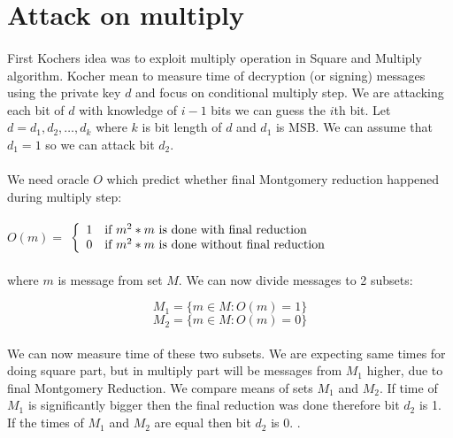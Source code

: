 \documentclass[thesis=B,english]{FITthesis}[2012/10/20]
\begin{document}
\section{Attack on multiply}
\paragraph*{}{
First Kochers idea was to exploit multiply operation in Square and Multiply algorithm. Kocher mean to measure time of decryption (or signing) messages using the private key \(d\) 
and focus on conditional multiply step. We are attacking each bit of \(d\) with knowledge of \( i-1\) bits we can guess the \(i\)th bit. Let \(d = d_1,d_2, \ldots ,d_k \) where \(k\) is bit length of \(d\) and \(d_1\) is MSB. 
We can assume that \( d_1 = 1\) so we can attack bit \(d_2\).
}
\paragraph*{}{
We need oracle \(O\) which predict whether final Montgomery reduction happened during multiply step:
}
\paragraph*{}

\( O(m) =\) $\left\{
  \begin{array}{cl}
    \text{1} & \text{\mbox{if}  \(m^2 * m\) is done with final reduction} \\
    \text{0} & \text{\mbox{if}  \(m^2 * m\) is done without final reduction} 
  \end{array}
\right.$

\paragraph*{}
{
where \(m\) is message from set \(M\). We can now divide messages to 2 subsets:}

\[M_1 = \{m \in M : O(m) = 1\}\]
\[M_2 = \{m \in M : O(m) = 0\}\]

\paragraph*{}{
We can now measure time of these two subsets. We are expecting same times for doing square part, but in multiply part will be messages from \(M_1\) higher, due to
final Montgomery Reduction. We compare means of sets \(M_1\) and \(M_2\). If time of \(M_1\) is significantly bigger then the final reduction was done therefore bit \(d_2\)
is 1. If the times of \(M_1\) and \(M_2\) are equal then bit \(d_2\) is 0. . }
\end{document}
